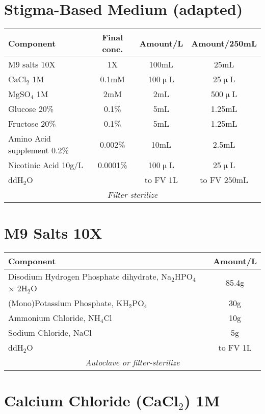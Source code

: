 \documentclass[a4paper,10pt]{article}
\begin{document}
\section*{Stigma-Based Medium (adapted)}

\begin{tabular}{ | l c c c | }
	\hline
 	\textbf{Component} & \textbf{Final conc.} & \textbf{Amount/L} & \textbf{Amount/250mL} \\
	\hline\hline
	M9 salts 10X & 1X & 100mL & 25mL \\ 
	\hline
	CaCl$_2$ 1M & 0.1mM & 100$\upmu$L & 25$\upmu$L \\
	\hline
	MgSO$_4$ 1M & 2mM & 2mL & 500$\upmu$L \\
	\hline
	Glucose 20\% & 0.1\% & 5mL & 1.25mL \\
	\hline
	Fructose 20\% & 0.1\% & 5mL & 1.25mL \\
	\hline
	Amino Acid supplement 0.2\% & 0.002\% & 10mL & 2.5mL \\
	\hline
	Nicotinic Acid 10g/L & 0.0001\% & 100$\upmu$L & 25$\upmu$L \\
	\hline \hline
	ddH$_2$O &  & to FV 1L & to FV 250mL \\
	\hline \hline
	\multicolumn{4}{|c|}{\textit{Filter-sterilize}} \\
	\hline
\end{tabular}


\section*{M9 Salts 10X}

\begin{tabular}{ | l c | }
	\hline
 	\textbf{Component} & \textbf{Amount/L} \\
	\hline\hline
	Disodium Hydrogen Phosphate dihydrate, Na$_2$HPO$_4$ $\times$ 2H$_2$O & 85.4g \\ 
	\hline
	(Mono)Potassium Phosphate, KH$_2$PO$_4$ & 30g \\
	\hline
	Ammonium Chloride, NH$_4$Cl & 10g \\
	\hline
	Sodium Chloride, NaCl & 5g \\
	\hline \hline
	ddH$_2$O & to FV 1L \\
	\hline \hline
	\multicolumn{2}{|c|}{\textit{Autoclave or filter-sterilize}} \\
	\hline
\end{tabular}


\section*{Calcium Chloride (CaCl$_2$) 1M}
\end{document}
